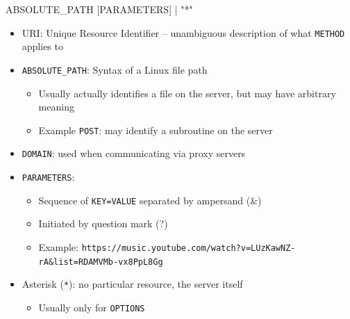 \begin{frame}
%
\begin{codebox}
\ttfamily
[DOMAIN] ABSOLUTE\_PATH [PARAMETERS] | "*" 
\end{codebox}
%
\begin{itemize}
\item URI: Unique Resource Identifier -- unambiguous description of what \texttt{METHOD} applies to
\item \texttt{ABSOLUTE\_PATH}: Syntax of a Linux file path
	\begin{itemize}
	\item Usually actually identifies a file on the server, but may have arbitrary meaning
	\item Example \texttt{POST}: may identify a subroutine on the server
	\end{itemize}
\item \texttt{DOMAIN}: used when communicating via proxy servers
\item \texttt{PARAMETERS}: 
	\begin{itemize}
	\item Sequence of \texttt{KEY=VALUE} separated by ampersand (\&)
	\item Initiated by question mark (?)
	\item Example: \texttt{{\color{gray}https://music.youtube.com}{\color{cyan}/watch}{\color{purple}?}{\color{blue}v=LUzKawNZ-rA}{\color{purple}\&}{\color{blue}list=RDAMVMb-vx8PpL8Gg}}
	\end{itemize}
\item Asterisk (\texttt{*}): no particular resource, the server itself
	\begin{itemize}
	\item Usually only for \texttt{OPTIONS}
	\end{itemize}
\end{itemize}
%
\end{frame}


